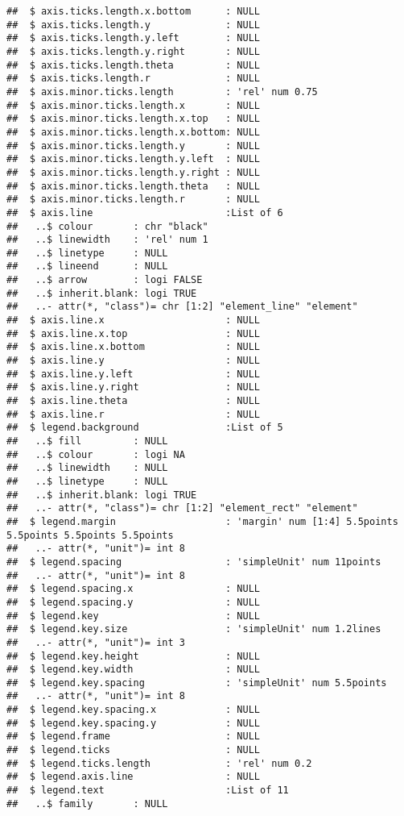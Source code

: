 \documentclass[
]{article}
\begin{document}
\begin{verbatim}
##  $ axis.ticks.length.x.bottom      : NULL
##  $ axis.ticks.length.y             : NULL
##  $ axis.ticks.length.y.left        : NULL
##  $ axis.ticks.length.y.right       : NULL
##  $ axis.ticks.length.theta         : NULL
##  $ axis.ticks.length.r             : NULL
##  $ axis.minor.ticks.length         : 'rel' num 0.75
##  $ axis.minor.ticks.length.x       : NULL
##  $ axis.minor.ticks.length.x.top   : NULL
##  $ axis.minor.ticks.length.x.bottom: NULL
##  $ axis.minor.ticks.length.y       : NULL
##  $ axis.minor.ticks.length.y.left  : NULL
##  $ axis.minor.ticks.length.y.right : NULL
##  $ axis.minor.ticks.length.theta   : NULL
##  $ axis.minor.ticks.length.r       : NULL
##  $ axis.line                       :List of 6
##   ..$ colour       : chr "black"
##   ..$ linewidth    : 'rel' num 1
##   ..$ linetype     : NULL
##   ..$ lineend      : NULL
##   ..$ arrow        : logi FALSE
##   ..$ inherit.blank: logi TRUE
##   ..- attr(*, "class")= chr [1:2] "element_line" "element"
##  $ axis.line.x                     : NULL
##  $ axis.line.x.top                 : NULL
##  $ axis.line.x.bottom              : NULL
##  $ axis.line.y                     : NULL
##  $ axis.line.y.left                : NULL
##  $ axis.line.y.right               : NULL
##  $ axis.line.theta                 : NULL
##  $ axis.line.r                     : NULL
##  $ legend.background               :List of 5
##   ..$ fill         : NULL
##   ..$ colour       : logi NA
##   ..$ linewidth    : NULL
##   ..$ linetype     : NULL
##   ..$ inherit.blank: logi TRUE
##   ..- attr(*, "class")= chr [1:2] "element_rect" "element"
##  $ legend.margin                   : 'margin' num [1:4] 5.5points 5.5points 5.5points 5.5points
##   ..- attr(*, "unit")= int 8
##  $ legend.spacing                  : 'simpleUnit' num 11points
##   ..- attr(*, "unit")= int 8
##  $ legend.spacing.x                : NULL
##  $ legend.spacing.y                : NULL
##  $ legend.key                      : NULL
##  $ legend.key.size                 : 'simpleUnit' num 1.2lines
##   ..- attr(*, "unit")= int 3
##  $ legend.key.height               : NULL
##  $ legend.key.width                : NULL
##  $ legend.key.spacing              : 'simpleUnit' num 5.5points
##   ..- attr(*, "unit")= int 8
##  $ legend.key.spacing.x            : NULL
##  $ legend.key.spacing.y            : NULL
##  $ legend.frame                    : NULL
##  $ legend.ticks                    : NULL
##  $ legend.ticks.length             : 'rel' num 0.2
##  $ legend.axis.line                : NULL
##  $ legend.text                     :List of 11
##   ..$ family       : NULL

\end{verbatim}
\end{document}
